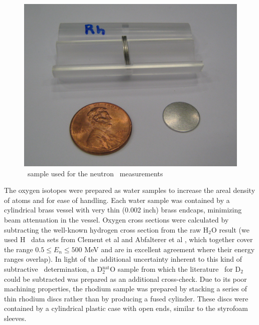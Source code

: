\begin{figure}
    \includegraphics[scale=0.25]{figures/RhodiumSample.jpg}
    \caption{\rhThree\ sample used for the neutron \tot\ measurements}
    \label{SamplesImage}
\end{figure}


The oxygen isotopes were prepared as water samples to increase the areal density
of atoms and for ease of handling. Each water sample was contained by a
cylindrical brass vessel with very thin (0.002 inch) brass endcaps, minimizing
beam attenuation in the vessel. Oxygen cross sections were calculated by
subtracting the well-known hydrogen cross section from the raw H$_{2}$O result
(we used H \tot\ data sets from Clement et al \cite{Clement1972} and Abfalterer
et al \cite{Abfalterer2001}, which together cover the range $0.5 \leq E_n \leq 500$ MeV
and are in excellent agreement where their energy ranges overlap). In light of
the additional uncertainty inherent to this kind of subtractive \tot\
determination, a D$_{2}^{\text{nat}}$O sample from which the literature \tot\ for
D$_{2}$ could be subtracted was prepared as an additional cross-check. Due to its poor 
machining properties, the rhodium
sample was prepared by stacking a series of thin rhodium discs rather than by
producing a fused cylinder. These discs were contained by a cylindrical plastic
case with open ends, similar to the styrofoam sleeves.

